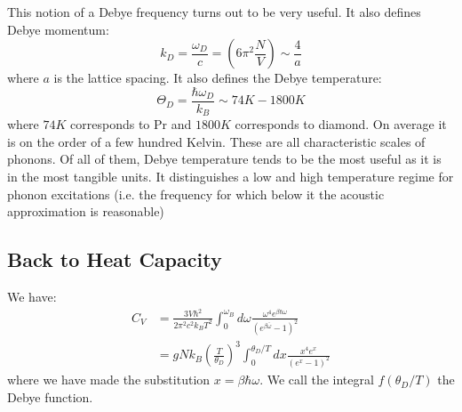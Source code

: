 This notion of a Debye frequency turns out to be very useful. It also defines Debye momentum:
\begin{equation}
    k_D = \frac{\omega_D}{c} = \left(6\pi^2\frac{N}{V}\right) \sim \frac{4}{a}
\end{equation}
where $a$ is the lattice spacing. It also defines the Debye temperature:
\begin{equation}
    \Theta_D = \frac{\hbar\omega_D}{k_B} \sim 74\si{K} - 1800\si{K}
\end{equation}
where $74\si{K}$ corresponds to Pr and $1800\si{K}$ corresponds to diamond. On average it is on the order of a few hundred Kelvin. These are all characteristic scales of phonons. Of all of them, Debye temperature tends to be the most useful as it is in the most tangible units. It distinguishes a low and high temperature regime for phonon excitations (i.e. the frequency for which below it the acoustic approximation is reasonable)

\subsection{Back to Heat Capacity}
We have:
\begin{equation}
    \begin{split}
        C_V &= \frac{3V\hbar^2}{2\pi^2c^2k_BT^2}\int_0^{\omega_B}d\omega \frac{\omega^4 e^{\beta\hbar\omega}}{(e^{\beta\bar\omega} - 1)^2}
        \\ &= gNk_B\left(\frac{T}{\theta_D}\right)^3\int_0^{\theta_D/T} dx \frac{x^4e^x}{(e^x - 1)^2}
    \end{split}
\end{equation}
where we have made the substitution $x = \beta\hbar\omega$. We call the integral $f(\theta_D/T)$ the Debye function.

